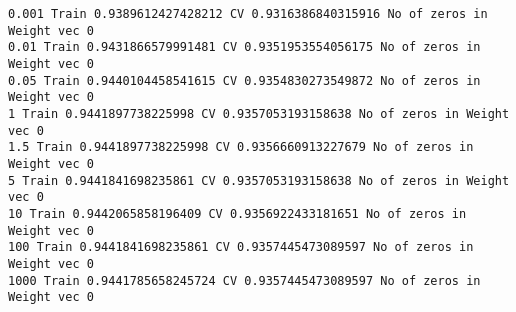 \documentclass[11pt]{article}
\begin{document}
    \begin{Verbatim}[commandchars=\\\{\}]
0.001 Train 0.9389612427428212 CV 0.9316386840315916 No of zeros in Weight vec 0
0.01 Train 0.9431866579991481 CV 0.9351953554056175 No of zeros in Weight vec 0
0.05 Train 0.9440104458541615 CV 0.9354830273549872 No of zeros in Weight vec 0
1 Train 0.9441897738225998 CV 0.9357053193158638 No of zeros in Weight vec 0
1.5 Train 0.9441897738225998 CV 0.9356660913227679 No of zeros in Weight vec 0
5 Train 0.9441841698235861 CV 0.9357053193158638 No of zeros in Weight vec 0
10 Train 0.9442065858196409 CV 0.9356922433181651 No of zeros in Weight vec 0
100 Train 0.9441841698235861 CV 0.9357445473089597 No of zeros in Weight vec 0
1000 Train 0.9441785658245724 CV 0.9357445473089597 No of zeros in Weight vec 0

    \end{Verbatim}
\end{document}
